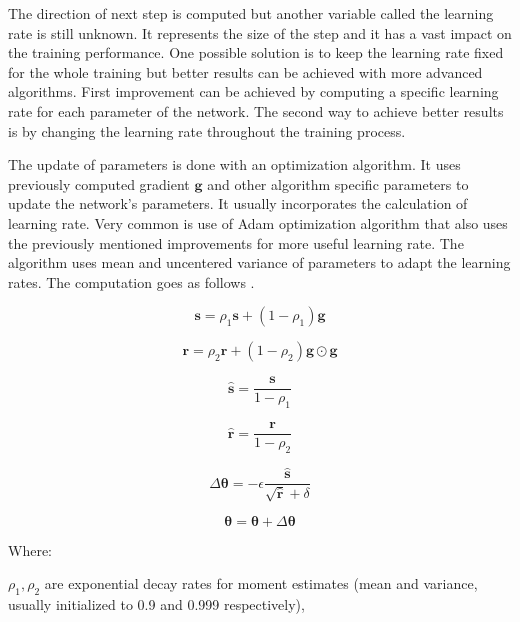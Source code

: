 The direction of next step is computed but another variable called the learning rate is still unknown. It represents the size of the step and it has a vast impact on the training performance. One possible solution is to keep the learning rate fixed for the whole training but better results can be achieved with more advanced algorithms. First improvement can be achieved by computing a specific learning rate for each parameter of the network. The second way to achieve better results is by changing the learning rate throughout the training process.

The update of parameters is done with an optimization algorithm. It uses previously computed gradient $\pmb g$ and other algorithm specific parameters to update the network's parameters. It usually incorporates the calculation of learning rate. Very common is use of Adam optimization algorithm that also uses the previously mentioned improvements for more useful learning rate. The algorithm uses mean and uncentered variance of parameters to adapt the learning rates. The computation goes as follows \cite{kingma2017adam}.

\begin{equation}
    \pmb s = \rho_1 \pmb s + (1 - \rho_1) \pmb g
\end{equation}

\begin{equation}
    \pmb r = \rho_2 \pmb r + (1 - \rho_2) \pmb g \odot \pmb g
\end{equation}

\begin{equation}
    \hat{\pmb s} = \frac{\pmb s}{1 - \rho_1}
\end{equation}

\begin{equation}
    \hat{\pmb r} = \frac{\pmb r}{1 - \rho_2}
\end{equation}

\begin{equation}
    \Delta \pmb \theta = - \epsilon \frac{\hat{\pmb s}}{\sqrt{\hat{\pmb r}} + \delta}
\end{equation}

\begin{equation}
    \pmb \theta = \pmb \theta + \Delta \pmb \theta
\end{equation}

\noindent Where:

$\rho_1, \rho_2$ are exponential decay rates for moment estimates (mean and variance, usually initialized to 0.9 and 0.999 respectively),

